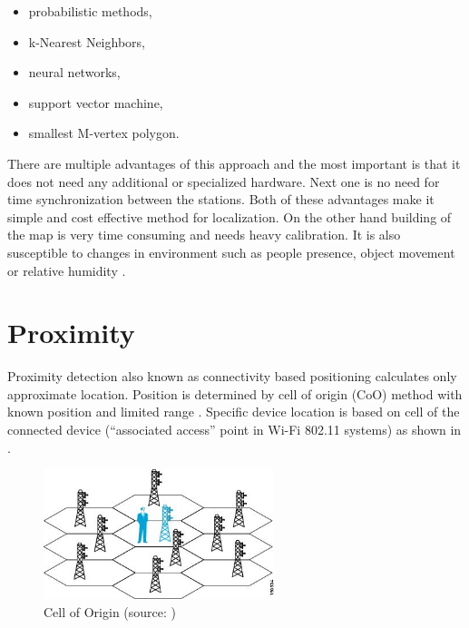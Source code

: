 \begin{itemize}
	\item probabilistic methods,
	\item k-Nearest Neighbors,
	\item neural networks,
	\item support vector machine,
	\item smallest M-vertex polygon.
\end{itemize}

There are multiple advantages of this approach and the most important is that it does not need any additional or specialized hardware. Next one is no need for time synchronization between the stations. Both of these advantages make it simple and cost effective method for localization. On the other hand building of the map is very time consuming and needs heavy calibration. It is also susceptible to changes in environment such as people presence, object movement or relative humidity \cite{IILUBLEB, RSSFofIFD}.

\section{Proximity}\label{sec:Proximity}
Proximity detection also known as connectivity based positioning calculates only approximate location. Position is determined by cell of origin (CoO) method with known position and limited range \cite{RAinWILTaS}. Specific device location is based on cell of the connected device (\enquote{associated access} point in Wi-Fi 802.11 systems) as shown in  \cite{WiFiLBS}.

\begin{figure}[h!]
	\begin{centering}
		\includegraphics[width=0.6\textwidth]{img/cell_of_origin}
		\par\end{centering}
	\caption{Cell of Origin (source: \cite{WiFiLBS})\label{fig:CellOfOrigin}}
	\label{fig5}
\end{figure}

